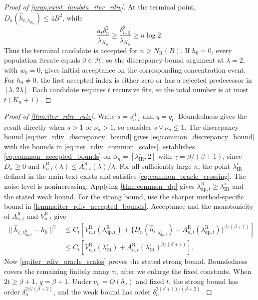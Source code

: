 \begin{proof}[Proof of \cref{prop:exist_lambda_iter_rdiv}]
At the terminal point, $D_n(\hat h_{t,\lambda_{K_n}})\leqslant4B^2$, while
\[
\frac{a_t\delta_n^2}{\lambda_{K_n}}
\geqslant\frac{\delta_{n,\xi}^2}{\lambda_{K_n}}
\geqslant n\log2.
\]
Thus the terminal candidate is accepted for $n\geqslant N_{\mathrm R}(B)$. If
$h_0=0$, every population iterate equals $0\in\mathcal H$, so the
discrepancy-bound argument at $\lambda=2$, with $w_0=0$, gives initial acceptance on
the corresponding concentration event. For $h_0\ne0$, the first accepted index is either zero or
has a rejected predecessor in $[\lambda,2\lambda]$. Each candidate requires
$t$ recursive fits, so the total number is at most $t(K_n+1)$.
\end{proof}

\begin{proof}[Proof of \cref{thm:iter_rdiv_rate}]
Write $s=s_{n,t}^{\mathrm R}$ and $q=q_t$. Boundedness gives the result directly when $s>1$ or $\nu_n>1$, so consider
$s\vee\nu_n\leqslant1$. The discrepancy bound
\eqref{eq:iter_rdiv_discrepancy_bound} gives
\eqref{eq:common_discrepancy_bound} with the bounds in
\eqref{eq:iter_rdiv_common_scales}.
 establishes
\eqref{eq:common_accepted_bounds} on
$\mathcal S_n=[\lambda_{\mathrm{IR}}^\circ,2]$ with
$\gamma=\beta/(\beta+1)$, since $D_n\geqslant0$ and
$V_{n,t}^{\mathrm R}(\lambda)\leqslant A_{n,t}^{\mathrm R}(\lambda)/\lambda$.
For all sufficiently large $n$, the point
$\lambda_{\mathrm{IR}}^\circ$ defined in the main text exists and
satisfies \eqref{eq:common_oracle_crossing}. The noise level is
nonincreasing. Applying \cref{thm:common_dp} gives
$\lambda_{\mathrm{dp},t}^{\mathrm R}\geqslant\lambda_{\mathrm{IR}}^\circ$
and the stated weak bound. For the strong bound, use the sharper
method-specific bound in
\cref{lemma:iter_rdiv_accepted_bounds}. Acceptance and the monotonicity of
$A_{n,t}^{\mathrm R}$ and $V_{n,t}^{\mathrm R}$ give
\[
\begin{aligned}
\|\hat h_{t,\lambda_{\mathrm{dp},t}^{\mathrm R}}-h_0\|^2
&\leqslant C_t\left[
V_{n,t}^{\mathrm R}(\lambda_{\mathrm{dp},t}^{\mathrm R})
+\{D_n(\hat h_{t,\lambda_{\mathrm{dp},t}^{\mathrm R}})
+A_{n,t}^{\mathrm R}(\lambda_{\mathrm{dp},t}^{\mathrm R})\}^{\beta/(\beta+1)}
\right]\\
&\leqslant C_t\left[
V_{n,t}^{\mathrm R}(\lambda_{\mathrm{IR}}^\circ)
+A_{n,t}^{\mathrm R}(\lambda_{\mathrm{IR}}^\circ)^{\beta/(\beta+1)}
\right].
\end{aligned}
\]
Now \eqref{eq:iter_rdiv_oracle_scales} proves the stated strong bound.
Boundedness covers the remaining finitely many $n$, after we enlarge the
fixed constants. When $2t\geqslant\beta+1$, $q=\beta+1$.
Under $\nu_n=O(\delta_n)$ and fixed $t$, the strong bound has order
$\delta_n^{2\beta/(\beta+2)}$, and the weak bound has order
$\delta_n^{2(\beta+1)/(\beta+2)}$.
\end{proof}


